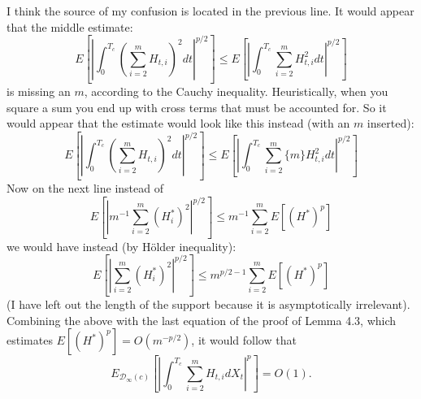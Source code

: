 


\noindent I think the source of my confusion is located in the previous line. It would appear that the middle estimate:
$$E\left[\left\vert\int^{T_c}_0 (\sum^m_{i =2} H_{t,i})^2 dt\right\vert^{p/2}\right] \leq E\left[\left\vert\int^{T_c}_0 \sum^m_{i =2} H_{t,i}^2 dt\right\vert^{p/2}\right]$$
is missing an $m$, according to the Cauchy inequality. Heuristically, when you square a sum you end up with cross terms that must be accounted for. So it would appear that the estimate would look like this instead (with an $m$ inserted):
$$E\left[\left\vert\int^{T_c}_0 \left(\sum^m_{i =2} H_{t,i}\right)^2 dt\right\vert^{p/2}\right] \leq E\left[\left\vert\int^{T_c}_0 \sum^m_{i =2} { \{m\}   }H_{t,i}^2 dt\right\vert^{p/2}\right]$$
Now on the next line instead of 
$$ E\left[\left\vert m^{-1} \sum^m_{i =2}(H_{i}^*)^2 \right\vert^{p/2}\right] \leq m^{-1}\sum_{i=2}^m E[(H^*)^p]$$
 we would have instead (by H\"older inequality):
 $$ E\left[\left\vert \sum^m_{i =2}(H_{i}^*)^2 \right\vert^{p/2}\right] \leq m^{p/2 -1}\sum_{i=2}^m E[(H^*)^p]$$
(I have left out the length of the support because it is asymptotically irrelevant). Combining the above with the last equation of the proof of Lemma 4.3, which estimates $E[(H^*)^p] = O(m^{-p/2})$, it would follow that
$$ E_{\mathcal{D}_\infty(c)} \left[\left\vert \int^{T_c}_0 \sum^m_{i=2} H_{t,i} dX_t\right\vert^p\right] = O(1).$$

